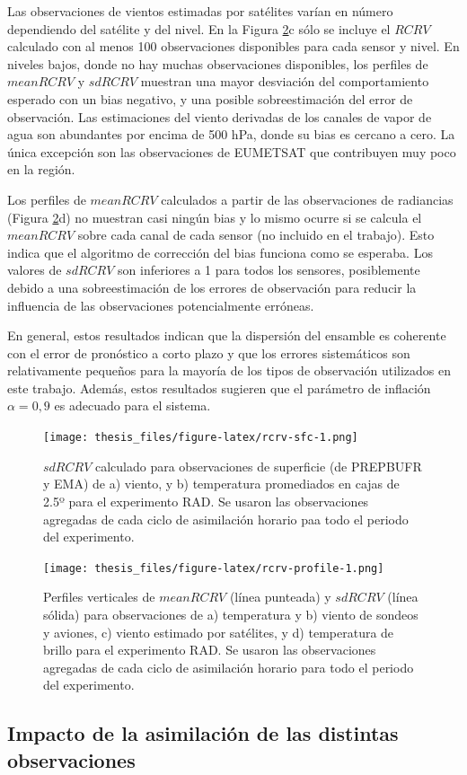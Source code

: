 \documentclass[12pt,oneside]{reedthesis}
\begin{document}
Las observaciones de vientos estimadas por satélites varían en número dependiendo del satélite y del nivel. En la Figura \ref{fig:rcrv-profile}c sólo se incluye el \(RCRV\) calculado con al menos 100 observaciones disponibles para cada sensor y nivel. En niveles bajos, donde no hay muchas observaciones disponibles, los perfiles de \(meanRCRV\) y \(sdRCRV\) muestran una mayor desviación del comportamiento esperado con un bias negativo, y una posible sobreestimación del error de observación. Las estimaciones del viento derivadas de los canales de vapor de agua son abundantes por encima de 500 hPa, donde su bias es cercano a cero. La única excepción son las observaciones de EUMETSAT que contribuyen muy poco en la región.

Los perfiles de \(meanRCRV\) calculados a partir de las observaciones de radiancias (Figura \ref{fig:rcrv-profile}d) no muestran casi ningún bias y lo mismo ocurre si se calcula el \(mean RCRV\) sobre cada canal de cada sensor (no incluido en el trabajo). Esto indica que el algoritmo de corrección del bias funciona como se esperaba. Los valores de \(sd RCRV\) son inferiores a 1 para todos los sensores, posiblemente debido a una sobreestimación de los errores de observación para reducir la influencia de las observaciones potencialmente erróneas.

En general, estos resultados indican que la dispersión del ensamble es coherente con el error de pronóstico a corto plazo y que los errores sistemáticos son relativamente pequeños para la mayoría de los tipos de observación utilizados en este trabajo. Además, estos resultados sugieren que el parámetro de inflación \(\alpha = 0,9\) es adecuado para el sistema.


\begin{figure}
\centering
\texttt{[image: thesis\_files/figure-latex/rcrv-sfc-1.png]}
\caption{\label{fig:rcrv-sfc}\(sd RCRV\) calculado para observaciones de superficie (de PREPBUFR y EMA) de a) viento, y b) temperatura promediados en cajas de 2.5º para el experimento RAD. Se usaron las observaciones agregadas de cada ciclo de asimilación horario paa todo el periodo del experimento.}
\end{figure}

\begin{figure}
\centering
\texttt{[image: thesis\_files/figure-latex/rcrv-profile-1.png]}
\caption{\label{fig:rcrv-profile}Perfiles verticales de \(mean RCRV\) (línea punteada) y \(sd RCRV\) (línea sólida) para observaciones de a) temperatura y b) viento de sondeos y aviones, c) viento estimado por satélites, y d) temperatura de brillo para el experimento RAD. Se usaron las observaciones agregadas de cada ciclo de asimilación horario para todo el periodo del experimento.}
\end{figure}
\hypertarget{impacto-analisis}{%
\subsection{Impacto de la asimilación de las distintas observaciones}\label{impacto-analisis}}
\end{document}
